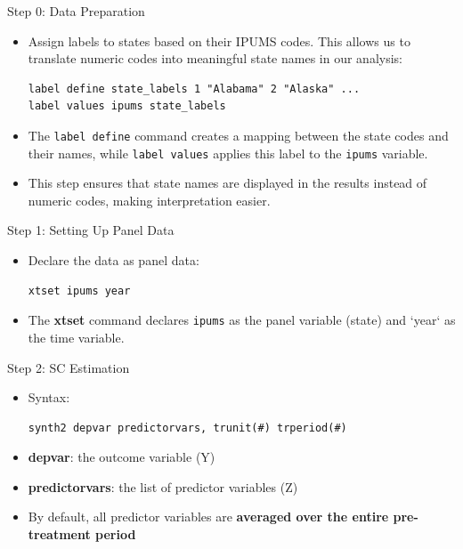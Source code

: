 \documentclass[hyperref={pdfpagelabels=false}]{beamer}
\begin{document}
\begin{frame}[fragile]{Step 0: Data Preparation}
\begin{itemize}
	\item Assign labels to states based on their IPUMS codes. This allows us to translate numeric codes into meaningful state names in our analysis:
	\vspace{0.2cm}
\begin{lstlisting}
label define state_labels 1 "Alabama" 2 "Alaska" ...
label values ipums state_labels
\end{lstlisting}
	\item The \texttt{label define} command creates a mapping between the state codes and their names, while \texttt{label values} applies this label to the \texttt{ipums} variable.
	\vspace{0.2cm}
	\item This step ensures that state names are displayed in the results instead of numeric codes, making interpretation easier.
\end{itemize}
\end{frame}





\begin{frame}[fragile]{Step 1: Setting Up Panel Data}
\begin{itemize}
	\item Declare the data as panel data:
\begin{lstlisting}
xtset ipums year
\end{lstlisting}
	\item The \textbf{xtset} command declares \texttt{ipums} as the panel variable (state) and `year` as the time variable.

\end{itemize}
\end{frame}


\begin{frame}[fragile]{Step 2: SC Estimation}
\begin{itemize}
	\item Syntax:	
\begin{lstlisting}
synth2 depvar predictorvars, trunit(#) trperiod(#)
\end{lstlisting}
	
	\item \textbf{depvar}: the outcome variable (Y)
	\vspace{0.2cm}
	\item \textbf{predictorvars}: the list of predictor variables (Z)
	\vspace{0.2cm}
	\item By default, all predictor variables are \textbf{averaged over the entire pre-treatment period}
\end{itemize}


\end{frame}
\end{document}
